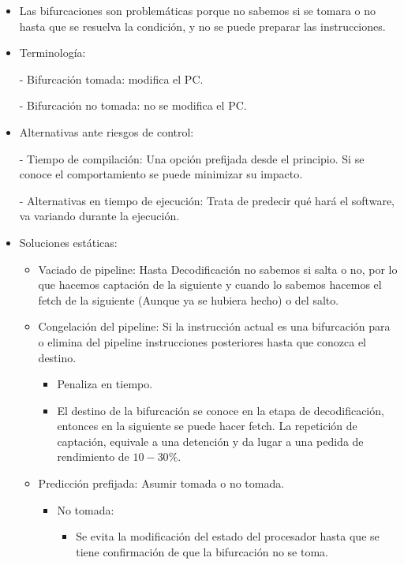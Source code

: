 \documentclass[12pt, twoside, openright]{report} %
\begin{document}
    \begin{itemize}
      \item Las bifurcaciones son problemáticas porque no sabemos si se tomara o no hasta que se resuelva la condición, y no se puede preparar las instrucciones.
      \item Terminología:
          
      - Bifurcación tomada: modifica el PC.
         
      - Bifurcación no tomada: no se modifica el PC.
      \item Alternativas ante riesgos de control:
          
      - Tiempo de compilación: Una opción prefijada desde el principio. Si se conoce el comportamiento se puede minimizar su impacto.
          
      - Alternativas en tiempo de ejecución: Trata de predecir qué hará el software, va variando durante la ejecución.
      \item Soluciones estáticas:
      \begin{itemize}
        \item Vaciado de pipeline: Hasta Decodificación no sabemos si salta o no, por lo que hacemos captación de la siguiente y cuando lo sabemos hacemos el fetch de la siguiente (Aunque ya se hubiera hecho) o del salto.
        \item Congelación del pipeline: Si la instrucción actual es una bifurcación para o elimina del pipeline instrucciones posteriores hasta que conozca el destino.
        \begin{itemize}
          \item Penaliza en tiempo.

          \item El destino de la bifurcación se conoce en la etapa de decodificación, entonces en la siguiente se puede hacer fetch. La repetición de captación, equivale a una detención y da lugar a una pedida de rendimiento de $10-30\%$.
        \end{itemize}
            
        \item Predicción prefijada: Asumir tomada o no tomada.
        \begin{itemize}
          \item No tomada:
            \begin{itemize}
              \item Se evita la modificación del estado del procesador hasta que se tiene confirmación de que la bifurcación no se toma.


\end{itemize}
\end{itemize}
\end{itemize}
\end{itemize}
\end{document}
